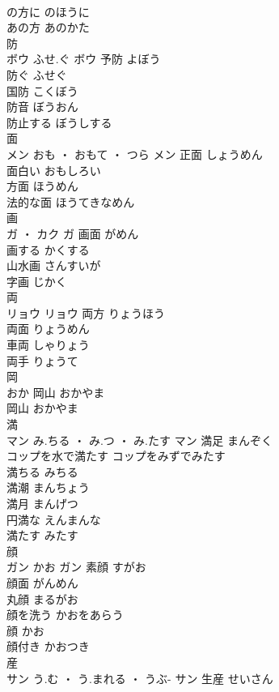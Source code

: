 \documentclass[8pt]{extreport}
\begin{document}
\begin{CJK}{UTF8}{min}
\\	の方に	のほうに	
\\	あの方	あのかた	
\\	防	
\\	ボウ	ふせ.ぐ	ボウ	予防	よぼう	
\\	防ぐ	ふせぐ	
\\	国防	こくぼう	
\\	防音	ぼうおん	
\\	防止する	ぼうしする	
\\	面	
\\	メン	おも ・ おもて ・ つら	メン	正面	しょうめん	
\\	面白い	おもしろい	
\\	方面	ほうめん	
\\	法的な面	ほうてきなめん	
\\	画	
\\	ガ ・ カク		ガ	画面	がめん	
\\	画する	かくする	
\\	山水画	さんすいが	
\\	字画	じかく	
\\	両	
\\	リョウ		リョウ	両方	りょうほう	
\\	両面	りょうめん	
\\	車両	しゃりょう	
\\	両手	りょうて	
\\	岡	
\\	おか		岡山	おかやま	
\\	岡山	おかやま	
\\	満	
\\	マン	み.ちる ・ み.つ ・ み.たす	マン	満足	まんぞく	
\\	コップを水で満たす	コップをみずでみたす	
\\	満ちる	みちる	
\\	満潮	まんちょう	
\\	満月	まんげつ	
\\	円満な	えんまんな	
\\	満たす	みたす	
\\	顔	
\\	ガン	かお	ガン	素顔	すがお	
\\	顔面	がんめん	
\\	丸顔	まるがお	
\\	顔を洗う	かおをあらう	
\\	顔	かお	
\\	顔付き	かおつき	
\\	産	
\\	サン	う.む ・ う.まれる ・ うぶ-	サン	生産	せいさん	

\end{CJK}
\end{document}
